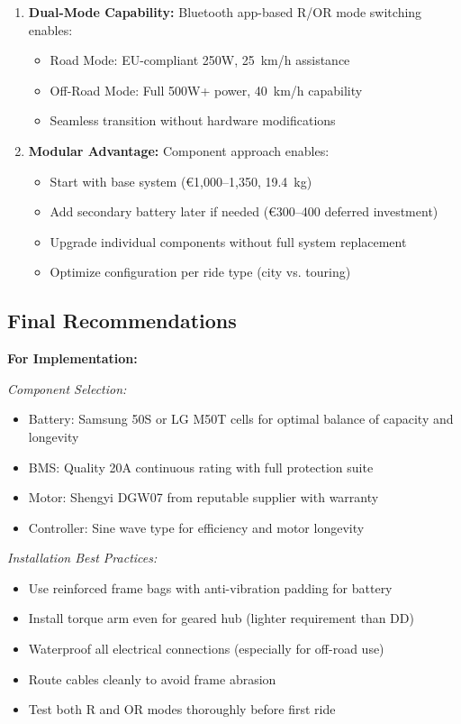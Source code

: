 \documentclass[12pt,a4paper]{article}
\begin{document}
\begin{enumerate}
    \item \textbf{Dual-Mode Capability:} Bluetooth app-based R/OR mode switching enables:
    \begin{itemize}
        \item Road Mode: EU-compliant 250W, 25~km/h assistance
        \item Off-Road Mode: Full 500W+ power, 40~km/h capability
        \item Seamless transition without hardware modifications
    \end{itemize}
    
    \item \textbf{Modular Advantage:} Component approach enables:
    \begin{itemize}
        \item Start with base system (€1,000--1,350, 19.4~kg)
        \item Add secondary battery later if needed (€300--400 deferred investment)
        \item Upgrade individual components without full system replacement
        \item Optimize configuration per ride type (city vs. touring)
    \end{itemize}
\end{enumerate}

\subsection{Final Recommendations}

\textbf{For Implementation:}

\textit{Component Selection:}
\begin{itemize}
    \item Battery: Samsung 50S or LG M50T cells for optimal balance of capacity and longevity
    \item BMS: Quality 20A continuous rating with full protection suite
    \item Motor: Shengyi DGW07 from reputable supplier with warranty
    \item Controller: Sine wave type for efficiency and motor longevity
\end{itemize}

\textit{Installation Best Practices:}
\begin{itemize}
    \item Use reinforced frame bags with anti-vibration padding for battery
    \item Install torque arm even for geared hub (lighter requirement than DD)
    \item Waterproof all electrical connections (especially for off-road use)
    \item Route cables cleanly to avoid frame abrasion
    \item Test both R and OR modes thoroughly before first ride
\end{itemize}
\end{document}
